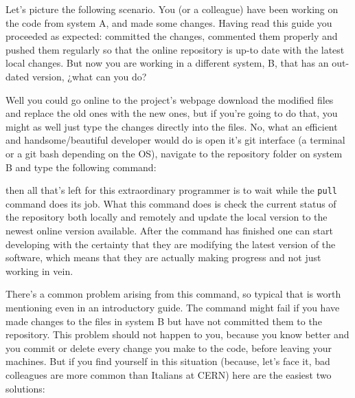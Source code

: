 \documentclass[runningheads,a4paper]{llncs}
\begin{document}
Let's picture the following scenario. You (or a colleague) have been working on the code from system A, and made some changes. Having read this guide you proceeded as expected: committed the changes, commented them properly and pushed them regularly so that the online repository is up-to date with the latest local changes. But now you are working in a different system, B, that has an out-dated version, ¿what can you do?

Well you could go online to the project's webpage download the modified files and replace the old ones with the new ones, but if you're going to do that, you might as well just type the changes directly into the files. No, what an efficient and handsome/beautiful developer would do is open it's git interface (a terminal or a git bash depending on the OS), navigate to the repository folder on system B and type the following command:\newline

 \newline

then all that's left for this extraordinary programmer is to wait while the \texttt{pull} command does its job. What this command does is check the current status of the repository both locally and remotely and update the local version to the newest online version available. After the command has finished one can start developing with the certainty that they are modifying the latest version of the software, which means that they are actually making progress and not just working in vein.

There's a common problem arising from this command, so typical that is worth mentioning even in an introductory guide. The command might fail if you have made changes to the files in system B but have not committed them to the repository. This problem should not happen to you, because you know better and you commit or delete every change you make to the code, before leaving your machines. But if you find yourself in this situation (because, let's face it, bad colleagues are more common than Italians at CERN) here are the easiest two solutions:

\end{document}
